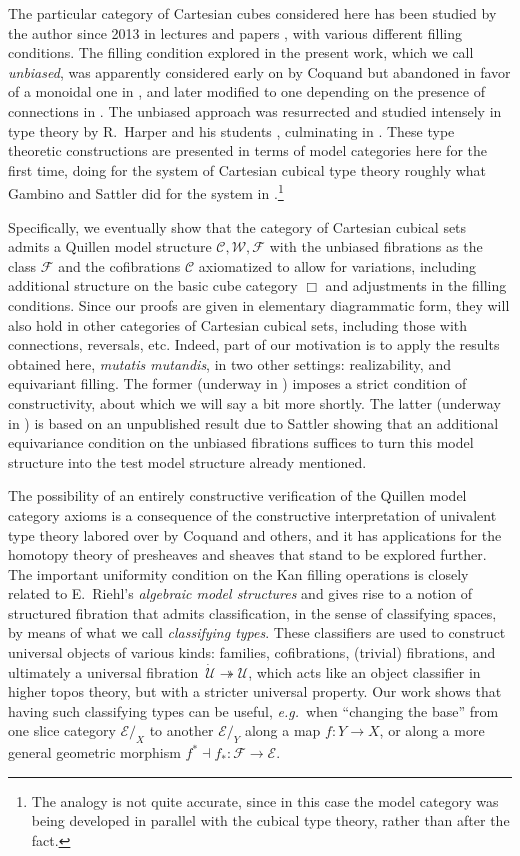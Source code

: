\documentclass[11pt]{amsart}
\newcommand{\eg}{\emph{e.g.}}
\newcommand{\CC}{\ensuremath{\mathcal{C}}}
\newcommand{\WW}{\ensuremath{\mathcal{W}}}
\newcommand{\FF}{\ensuremath{\mathcal{F}}}
\newcommand{\EE}{\ensuremath{\mathcal{E}}}
\newcommand{\fib}{\ensuremath{\twoheadrightarrow}}
\renewcommand{\to}{\ensuremath{\rightarrow}}
\newcommand{\U}{\ensuremath{\mathcal{U}}}
\newcommand{\UU}{\ensuremath{\,\dot{\mathcal{U}}}}
\theoremstyle{remark}
\theoremstyle{definition}
\begin{document}
The particular category of Cartesian cubes considered here has been studied by the author since 2013 in lectures and papers \cite{A2013,A2016,Stockholm,HoTT2019}, with various different filling conditions.  The filling condition explored in the present work, which we call \emph{unbiased}, was apparently considered early on by Coquand \cite{unpublished} but abandoned in favor of a monoidal one in \cite{BCH}, and later modified to one depending on the presence of connections in \cite{CCHM}.  The unbiased approach was resurrected and studied intensely in type theory by R.~Harper and his students \cite{BL,CA}, culminating in \cite{ABC}.   These type theoretic constructions are presented in terms of model categories here for the first time, doing for the system of Cartesian cubical type theory roughly what Gambino and Sattler \cite{GS,S} did for the system in \cite{CCHM}.\footnote{The analogy is not quite accurate, since in this case the model category was being developed in parallel with the cubical type theory, rather than after the fact.}

Specifically, we eventually show that the category of Cartesian cubical sets admits a Quillen model structure $\CC, \WW, \FF$ with the unbiased fibrations as the class $\FF$ and the cofibrations $\CC$ axiomatized to allow for variations, including additional structure on the basic cube category $\Box$ and adjustments in the filling conditions.  Since our proofs are given in elementary diagrammatic form, they will also hold in other categories of Cartesian cubical sets, including those with connections, reversals, etc.  Indeed, part of our motivation is to apply the results obtained here, \emph{mutatis mutandis}, in two other settings: realizability, and equivariant filling.  The former (underway in \cite{AAFS}) imposes a strict condition of constructivity, about which we will say a bit more shortly.   The latter (underway in \cite{ACCRS}) is based on an unpublished result due to Sattler showing that an additional equivariance condition on the unbiased fibrations suffices to turn this model structure into the test model structure already mentioned.  

The possibility of an entirely constructive verification of the Quillen model category axioms is a consequence of the constructive interpretation of univalent type theory labored over by Coquand and others, and it has applications for the homotopy theory of presheaves and sheaves that stand to be explored further.   The important uniformity condition on the Kan filling operations is closely related to E.~Riehl's \emph{algebraic model structures} \cite{R} and gives rise to a notion of structured fibration that admits classification, in the sense of classifying spaces, by means of what we call \emph{classifying types}.   These classifiers are used to construct universal objects of various kinds: families, cofibrations, (trivial) fibrations, and ultimately a universal fibration $\UU\fib\U$, which acts like an object classifier in higher topos theory, but with a stricter universal property.  Our work shows that having such classifying types can be useful, \eg\ when ``changing the base'' from one slice category $\EE/_X$ to another $\EE/_Y$ along a map $f : Y\to X$, or along a more general geometric morphism $f^*\dashv f_* : \FF \to \EE$.
\end{document}
